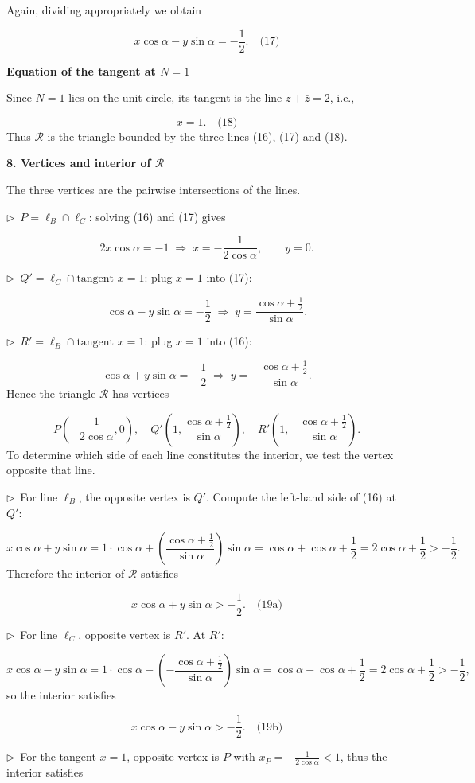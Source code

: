 \documentclass{llmxive}
\providecommand{\solutionheading}[1]{\par\smallskip\noindent\textbf{#1}\par}
\providecommand{\compactbullet}[1]{\par\noindent$\triangleright$~#1\par}
\begin{document}
Again, dividing appropriately we obtain\par
\[
x\cos\alpha - y\sin\alpha = -\frac12. \quad\text{(17)}
\]
\solutionheading{Equation of the tangent at \(N=1\)}
Since \(N=1\) lies on the unit circle, its tangent is the line \(z + \bar{z} = 2\), i.e.,\par
\[
x = 1. \quad\text{(18)}
\]
Thus \(\mathcal{R}\) is the triangle bounded by the three lines (16), (17) and (18).\par
\smallskip
\solutionheading{8. Vertices and interior of \(\mathcal{R}\)}
The three vertices are the pairwise intersections of the lines.\par
\compactbullet{\(P = \ell_B \cap \ell_C\): solving (16) and (17) gives}
\[
2x\cos\alpha = -1 \;\Longrightarrow\; x = -\frac{1}{2\cos\alpha},\qquad y = 0.
\]
\compactbullet{\(Q' = \ell_C \cap \text{tangent }x=1\): plug \(x=1\) into (17):}
\[
\cos\alpha - y\sin\alpha = -\frac12 \;\Longrightarrow\; y = \frac{\cos\alpha + \frac12}{\sin\alpha}.
\]
\compactbullet{\(R' = \ell_B \cap \text{tangent }x=1\): plug \(x=1\) into (16):}
\[
\cos\alpha + y\sin\alpha = -\frac12 \;\Longrightarrow\; y = -\frac{\cos\alpha + \frac12}{\sin\alpha}.
\]
Hence the triangle \(\mathcal{R}\) has vertices\par
\[
P\left(-\frac{1}{2\cos\alpha},0\right),\quad
Q'\left(1,\frac{\cos\alpha+\frac12}{\sin\alpha}\right),\quad
R'\left(1,-\frac{\cos\alpha+\frac12}{\sin\alpha}\right).
\]
To determine which side of each line constitutes the interior, we test the vertex opposite that line.\par
\compactbullet{For line \(\ell_B\), the opposite vertex is \(Q'\). Compute the left-hand side of (16) at \(Q'\):}
\[
x\cos\alpha + y\sin\alpha = 1\cdot\cos\alpha + \left(\frac{\cos\alpha+\frac12}{\sin\alpha}\right)\sin\alpha = \cos\alpha + \cos\alpha + \frac12 = 2\cos\alpha + \frac12 > -\frac12.
\]
Therefore the interior of \(\mathcal{R}\) satisfies\par
\[
x\cos\alpha + y\sin\alpha > -\frac12. \quad\text{(19a)}
\]
\compactbullet{For line \(\ell_C\), opposite vertex is \(R'\). At \(R'\):}
\[
x\cos\alpha - y\sin\alpha = 1\cdot\cos\alpha - \left(-\frac{\cos\alpha+\frac12}{\sin\alpha}\right)\sin\alpha = \cos\alpha + \cos\alpha + \frac12 = 2\cos\alpha + \frac12 > -\frac12,
\]
so the interior satisfies\par
\[
x\cos\alpha - y\sin\alpha > -\frac12. \quad\text{(19b)}
\]
\compactbullet{For the tangent \(x=1\), opposite vertex is \(P\) with \(x_P = -\frac{1}{2\cos\alpha} < 1\), thus the interior satisfies}
\end{document}
